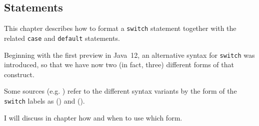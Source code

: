 \subsection{ Statements}\label{sec:SwitchStatements}
This chapter describes how to format a \lstinline|switch| statement together with the related \lstinline|case| and \lstinline|default| statements.

Beginning with the first preview in Java~12, an alternative syntax for \lstinline|switch| was introduced, so that we have now two (in fact, three) different forms of that construct.

Some sources (e.g. \autocite{ORACLE_DOC_SWITCHEXPRESSIONS}) refer to the different syntax variants by the form of the \lstinline|switch| labels as  () and  (). 



I will discuss in chapter  how and when to use which form.







